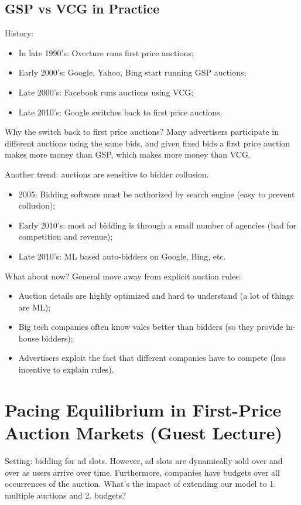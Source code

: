 \documentclass[dvipsnames]{article}
\theoremstyle{definition}
\theoremstyle{remark}
\begin{document}
\subsection{GSP vs VCG in Practice}
History:
\begin{itemize}
	\item In late 1990's: Overture runs first price auctions;
	\item Early 2000's: Google, Yahoo, Bing start running GSP auctions;
	\item Late 2000's: Facebook runs auctions using VCG;
	\item Late 2010's: Google switches back to first price auctions.
\end{itemize}
Why the switch back to first price auctions? Many advertisers participate in different auctions using the same bids, and given fixed bids a first price auction makes more money than GSP, which makes more money than VCG.

Another trend: auctions are sensitive to bidder collusion.
\begin{itemize}
	\item 2005: Bidding software must be authorized by search engine (easy to prevent collusion);
	\item Early 2010's: most ad bidding is through a small number of agencies (bad for competition and revenue);
	\item Late 2010's: ML based auto-bidders on Google, Bing, etc. 
\end{itemize}

What about now? General move away from explicit auction rules:
\begin{itemize}
	\item Auction details are highly optimized and hard to understand (a lot of things are ML);
	\item Big tech companies often know vales better than bidders (so they provide in-house bidders);
	\item Advertisers exploit the fact that different companies have to compete (less incentive to explain rules).
\end{itemize}

\newpage

\section{Pacing Equilibrium in First-Price Auction Markets (Guest Lecture)}

Setting: bidding for ad slots. However, ad slots are dynamically sold over and over as users arrive over time. Furthermore, companies have budgets over all occurrences of the auction. What's the impact of extending our model to 1. multiple auctions and 2. budgets?
\end{document}
